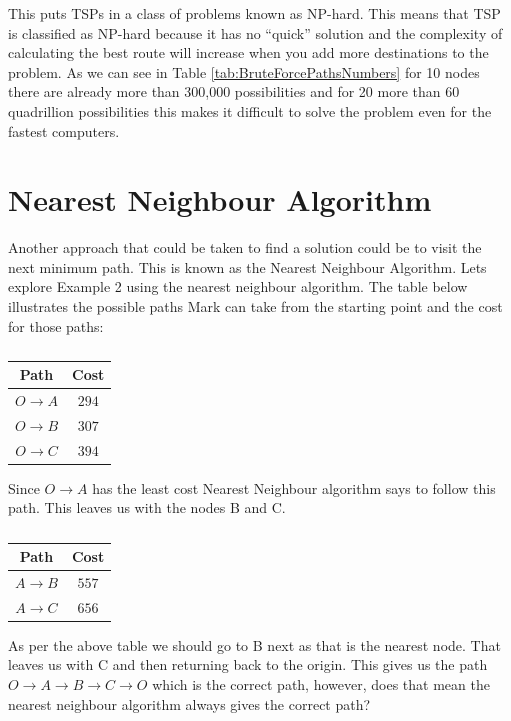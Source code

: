\documentclass[a4paper]{article}
\begin{document}
This puts TSPs in a class of problems known as NP-hard. This means that TSP is classified as NP-hard because it has no “quick” solution and the complexity of calculating the best route will increase when you add more destinations to the problem. As we can see in Table \ref{tab:BruteForcePathsNumbers} for 10 nodes there are already more than 300,000 possibilities and for 20 more than 60 quadrillion possibilities this makes it difficult to solve the problem even for the fastest computers.\\
\section*{Nearest Neighbour Algorithm}
Another approach that could be taken to find a solution could be to visit the next minimum path. This is known as the Nearest Neighbour Algorithm.
Lets explore Example 2 using the nearest neighbour algorithm. The table below illustrates the possible paths Mark can take from the starting point and the cost for those paths:
\begin{table}[H]
    \centering
    \begin{tabular}{|c|c|}
    \hline
    Path & Cost\\ 
    \hline
    $O\to A$ & $294$  \\
    $O\to B$ & $307$  \\
    $O\to C$ & $394$  \\
    \end{tabular}
    \caption{}
    \label{tab:path1Mark}
\end{table}
Since $O\to A$ has the least cost Nearest Neighbour algorithm says to follow this path. This leaves us with the nodes B and C.
\begin{table}[H]
    \centering
    \begin{tabular}{|c|c|}
    \hline
    Path & Cost\\ 
    \hline
    $A\to B$ & $557$  \\
    $A\to C$ & $656$  \\
    \end{tabular}
    \caption{}

    \label{tab:path2Mark}
\end{table}
As per the above table we should go to B next as that is the nearest node. That leaves us with C and then returning back to the origin. This gives us the path $O\to A \to B \to C \to O$ which is the correct path, however, does that mean the nearest neighbour algorithm always gives the correct path? \\
\end{document}
